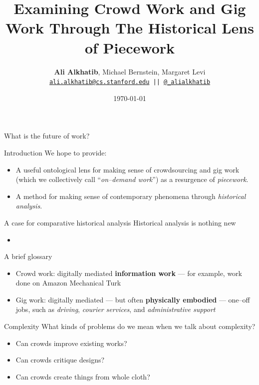 \documentclass{beamer}
\title{Examining Crowd Work and Gig Work Through The Historical Lens of Piecework}
\author{\textbf{Ali Alkhatib},
                Michael Bernstein,
                Margaret Levi\\
\texttt{ \scriptsize{\href{mailto:ali.alkhatib@cs.stanford.edu}{ali.alkhatib@cs.stanford.edu} ||
         \href{http://twitter.com/_alialkhatib}{@\_alialkhatib}} }}
\institute[Stanford]{Stanford University}
\date{\today}
\newcommand{\onlyinsubfile}[1]{#1}
\begin{document}
\renewcommand{\onlyinsubfile}[1]{}
\begin{frame}
\titlepage
\end{frame}



% 

\begin{frame}[standout]
    What is the future of work?


\end{frame}


\begin{frame}{Introduction}
  We hope to provide:
      \begin{itemize}
        \item A useful ontological lens for making sense of crowdsourcing and gig work (which we collectively call ``\textit{on--demand work}'') as a resurgence of \textit{piecework}.
        \item A method for making sense of contemporary phenomena through \textit{historical analysis}.
      \end{itemize}
\end{frame}

\begin{frame}{A case for comparative historical analysis}
Historical analysis is nothing new
    \begin{itemize}
      \item \textcite{Wyche2006,bodker1993historical}
    \end{itemize}
\end{frame}


\begin{frame}{A brief glossary}
    \begin{itemize}
      \item Crowd work: digitally mediated \textbf{information work}
      --- for example, work done on Amazon Mechanical Turk~\cite{crowdworkFuture}
      \item Gig work: digitally mediated --- but often \textbf{physically embodied} --- one--off jobs,
      such as
      \textit{driving},
      \textit{courier services},
      and \textit{administrative support}~\cite{friedman2014workers,Parigi:2016:GE:3026779.3013496}
    \end{itemize}
\end{frame}


\begin{frame}{Complexity}
  What kinds of problems do we mean when we talk about complexity?
  \begin{itemize}
    \item Can crowds improve existing works?~\cite{bernsteinSoylent,Kim:2014:CSI:2556288.2556986}
    \item Can crowds critique designs?~\cite{yuanAlmost}
    \item Can crowds create things from whole cloth?~\cite{KimStoria,Kim2017,Hahn:2016:KAB:2858036.2858364,Lasecki:2014:LSR:2661334.2661352}
  \end{itemize}
\end{frame}
\end{document}
